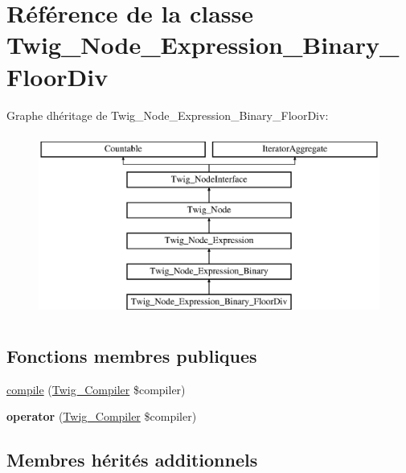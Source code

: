 \hypertarget{class_twig___node___expression___binary___floor_div}{}\section{Référence de la classe Twig\+\_\+\+Node\+\_\+\+Expression\+\_\+\+Binary\+\_\+\+Floor\+Div}
\label{class_twig___node___expression___binary___floor_div}
Graphe d\textquotesingle{}héritage de Twig\+\_\+\+Node\+\_\+\+Expression\+\_\+\+Binary\+\_\+\+Floor\+Div\+:\begin{figure}[H]
\begin{center}
\leavevmode
\includegraphics[height=6.000000cm]{class_twig___node___expression___binary___floor_div}
\end{center}
\end{figure}
\subsection*{Fonctions membres publiques}
\begin{DoxyCompactItemize}
\item 
\hyperlink{class_twig___node___expression___binary___floor_div_a4e0faa87c3fae583620b84d3607085da}{compile} (\hyperlink{class_twig___compiler}{Twig\+\_\+\+Compiler} \$compiler)
\item 
{\bfseries operator} (\hyperlink{class_twig___compiler}{Twig\+\_\+\+Compiler} \$compiler)\hypertarget{class_twig___node___expression___binary___floor_div_af77318ec88d5f8a508684970a150b670}{}\label{class_twig___node___expression___binary___floor_div_af77318ec88d5f8a508684970a150b670}

\end{DoxyCompactItemize}
\subsection*{Membres hérités additionnels}


